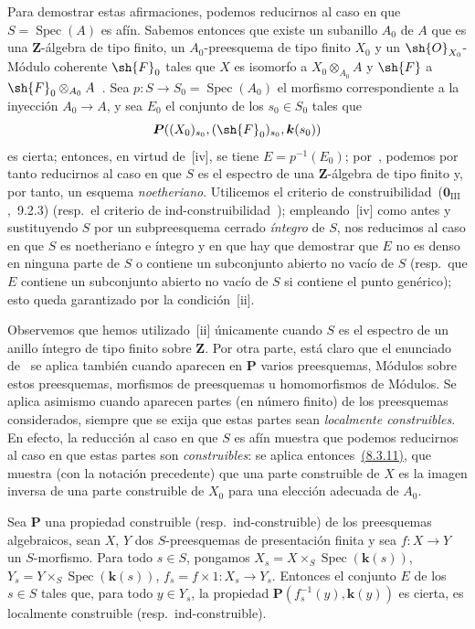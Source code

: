 Para demostrar estas afirmaciones, podemos reducirnos al caso en que $S=\operatorname{Spec}(A)$ es afín.
Sabemos entonces que existe un subanillo $A_0$ de $A$ que es una $\mathbf{Z}$-álgebra de tipo finito, un $A_0$-preesquema de tipo finito $X_0$ y un $\sh{O}_{X_0}$-Módulo coherente $\sh{F}_0$ tales que $X$ es isomorfo a $X_0\otimes_{A_0}A$ y $\sh{F}$ a $\sh{F}_0\otimes_{A_0}A$~.
Sea $p:S\to S_0=\operatorname{Spec}(A_0)$ el morfismo correspondiente a la inyección $A_0\to A$, y sea $E_0$ el conjunto de los $s_0\in S_0$ tales que
\[
  \boldsymbol{P}((X_0)_{s_0},(\sh{F}_0)_{s_0},\boldsymbol{k}(s_0))
\]
es cierta; entonces, en virtud de~[iv], se tiene $E=p^{-1}(E_0)$; por~, podemos por tanto reducirnos al caso en que $S$ es el espectro de una $\mathbf{Z}$-álgebra de tipo finito y, por tanto, un esquema \emph{noetheriano}.
Utilicemos el criterio de construibilidad~($\mathbf{0}_{\mathrm{III}}$,~9.2.3) (resp.\ el criterio de ind-construibilidad~); empleando~[iv] como antes y sustituyendo $S$ por un subpreesquema cerrado \emph{íntegro} de $S$, nos reducimos al caso en que $S$ es noetheriano e íntegro y en que hay que demostrar que $E$ no es denso en ninguna parte de $S$ o contiene un subconjunto abierto no vacío de $S$ (resp.\ que $E$ contiene un subconjunto abierto no vacío de $S$ si contiene el punto genérico); esto queda garantizado por la condición~[ii].

Observemos que hemos utilizado~[ii] únicamente cuando $S$ es el espectro de un anillo íntegro de tipo finito sobre $\mathbf{Z}$.
Por otra parte, está claro que el enunciado de~ se aplica también cuando aparecen en $\boldsymbol{P}$ varios preesquemas, Módulos sobre estos preesquemas, morfismos de preesquemas u homomorfismos de Módulos.
Se aplica asimismo cuando aparecen partes (en número finito) de los preesquemas considerados, siempre que se exija que estas partes sean \emph{localmente construibles}.
En efecto, la reducción al caso en que $S$ es afín muestra que podemos reducirnos al caso en que estas partes son \emph{construibles}: se aplica entonces~{\hyperlink{ega4.c04.thm.8-3-11}{(8.3.11)}}, que muestra (con la notación precedente) que una parte construible de $X$ es la imagen inversa de una parte construible de $X_0$ para una elección adecuada de $A_0$.

\begin{corollary}[9.2.4]
\label{IV.9.2.4}
Sea $\boldsymbol{P}$ una propiedad construible \textnormal{(resp.}\ ind-construible\textnormal{)} de los preesquemas algebraicos, sean $X$, $Y$ dos $S$-preesquemas de presentación finita y sea $f:X\to Y$ un $S$-morfismo.
Para todo $s\in S$, pongamos $X_s=X\times_S\operatorname{Spec}(\boldsymbol{k}(s))$, $Y_s=Y\times_S\operatorname{Spec}(\boldsymbol{k}(s))$, $f_s=f\times 1:X_s\to Y_s$.
Entonces el conjunto $E$ de los $s\in S$ tales que, para todo $y\in Y_s$, la propiedad $\boldsymbol{P}(f_s^{-1}(y),\boldsymbol{k}(y))$ es cierta, es localmente construible \textnormal{(resp.}\ ind-construible\textnormal{)}.
\end{corollary}

